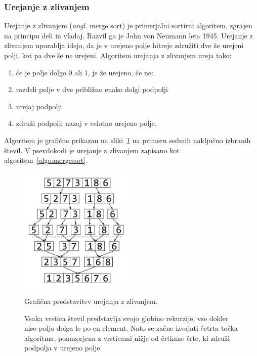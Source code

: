 \documentclass[a4paper,oneside,12pt]{article}
\begin{document}
\subsubsection{Urejanje z zlivanjem}
\label{chapter:mergesort}
Urejanje z zlivanjem (\emph{angl.} merge sort) je primerjalni sortirni algoritem, 
zgrajen na principu deli in vladaj. Razvil ga je John von Neumann leta 1945.
Urejanje z zlivanjem uporablja idejo, da je v urejeno polje hitreje združiti dve že
urejeni polji, kot pa dve še ne urejeni. 
Algoritem urejanja z zlivanjem ureja tako:
\begin{enumerate}
  \item če je polje dolgo 0 ali 1, je že urejeno, če ne:
  \item razdeli polje v dve približno enako dolgi podpolji
  \item urejaj podpolji 
  \item združi podpolji nazaj v celotno urejeno polje.
\end{enumerate}
Algoritem je grafično prikazan na sliki~\ref{fig:mergesortimage} na primeru sedmih
naključno izbranih števil.
V psevdokodi je urejanje z zlivanjem zapisano kot algoritem~\ref{algo:mergesort}. 

\begin{figure}[ht]
    \begin{center}
        \includegraphics[height=60mm]{slike/mergesort.pdf}
    \end{center}
    \vspace{-0.7cm}
    \caption[Urejanje z zlivanjem]{Grafična predstavitev urejanja z zlivanjem.}
    \caption*{{\small Vsaka vrstica števil predstavlja svojo 
    globino rekurzije, vse dokler niso polja dolga le po en element.
    Nato se začne izvajati četrta točka algoritma, ponazorjena z vrsticami
    nižje od črtkane črte, ki združi podpolja v urejeno polje.}}
    \label{fig:mergesortimage}
\end{figure}
\end{document}
